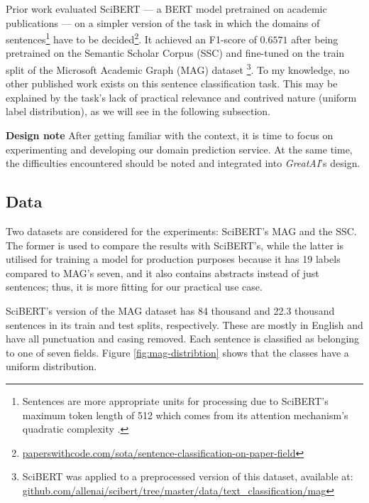 Prior work evaluated SciBERT \cite{beltagy2019scibert} --- a BERT \cite{devlin2018bert} model pretrained on academic publications --- on a simpler version of the task in which the domains of sentences\footnote{Sentences are more appropriate units for processing due to SciBERT's maximum token length of 512 which comes from its attention mechanism's quadratic complexity \cite{vaswani2017attention}.} have to be decided\footnote{\href{https://paperswithcode.com/sota/sentence-classification-on-paper-field}{paperswithcode.com/sota/sentence-classification-on-paper-field}}. It achieved an F1-score of $0.6571$ after being pretrained on the Semantic Scholar Corpus (SSC) \cite{Lo2020S2ORCTS} and fine-tuned on the train split of the Microsoft Academic Graph (MAG) dataset \cite{wang2019review}\footnote{SciBERT was applied to a preprocessed version of this dataset, available at: \\ \href{https://github.com/allenai/scibert/tree/master/data/text_classification/mag}{github.com/allenai/scibert/tree/master/data/text\_classification/mag}}. To my knowledge, no other published work exists on this sentence classification task. This may be explained by the task's lack of practical relevance and contrived nature (uniform label distribution), as we will see in the following subsection.

\begin{displayquote}
\textbf{Design note} After getting familiar with the context, it is time to focus on experimenting and developing our domain prediction service. At the same time, the difficulties encountered should be noted and integrated into \textit{GreatAI}'s design.
\end{displayquote}

\subsection{Data}

Two datasets are considered for the experiments: SciBERT's MAG and the SSC. The former is used to compare the results with SciBERT's, while the latter is utilised for training a model for production purposes because it has 19 labels compared to MAG's seven, and it also contains abstracts instead of just sentences; thus, it is more fitting for our practical use case.

SciBERT's version of the MAG dataset has 84 thousand and 22.3 thousand sentences in its train and test splits, respectively. These are mostly in English and have all punctuation and casing removed. Each sentence is classified as belonging to one of seven fields. Figure \ref{fig:mag-distribtion} shows that the classes have a uniform distribution. 

